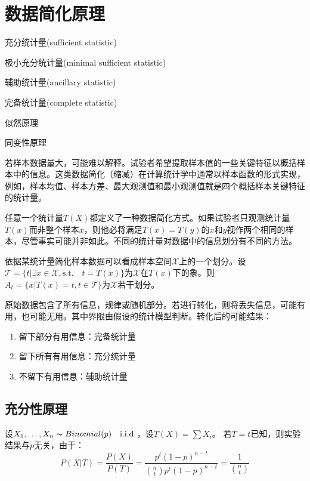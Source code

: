 \chapter{数据简化原理}

\begin{introduction}
	\item 充分统计量(sufficient statistic)
	\item 极小充分统计量(minimal sufficient statistic)
	\item 辅助统计量(ancillary statistic)
	\item 完备统计量(complete statistic)
	\item 似然原理
	\item 同变性原理
\end{introduction}

若样本数据量大，可能难以解释。试验者希望提取样本值的一些关键特征以概括样本中的信息。这类数据简化（缩减）在计算统计学中通常以样本函数的形式实现，例如，样本均值、样本方差、最大观测值和最小观测值就是四个概括样本关键特征的统计量。

任意一个统计量$T(X)$都定义了一种数据简化方式。如果试验者只观测统计量$T(x)$而非整个样本$x$，则他必将满足$T(x) = T(y)$的$x$和$y$视作两个相同的样本，尽管事实可能并非如此。不同的统计量对数据中的信息划分有不同的方法。

依据某统计量简化样本数据可以看成样本空间$\mathcal{X}$上的一个划分。设$\mathcal{T}=\{t|\exists x \in \mathcal{X}, \text{s.t.} \quad  t=T(x) \}$为$\mathcal{X}$在$T(x)$下的象。则$A_t=\{x|T(x)=t, t \in \mathcal{T}\}$为$\mathcal{X}$若干划分。

原始数据包含了所有信息，规律或随机部分。若进行转化，则将丢失信息，可能有用，也可能无用。其中界限由假设的统计模型判断。转化后的可能结果：
\begin{enumerate}
	\item 留下部分有用信息：完备统计量
	\item 留下所有有用信息：充分统计量
	\item 不留下有用信息：辅助统计量
\end{enumerate}

\section{充分性原理}

\begin{example}
	设$X_1,\dots,X_n \thicksim Binomial(p) \quad \text{i.i.d.} $，设$T(X)=\sum X_i$。
	若$T=t$已知，则实验结果与$p$无关，由于：
	$$P(X|T)=\frac{P(X)}{P(T)}=\frac{p^t(1-p)^{n-t}}{\binom{n}{t} p^t(1-p)^{n-t}}=\frac{1}{\binom{n}{t}}$$
\end{example}

